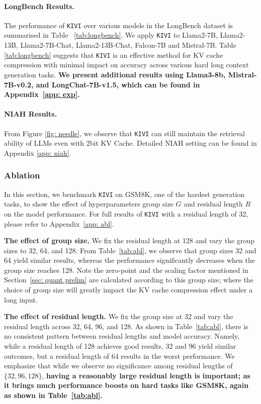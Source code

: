 \paragraph{LongBench Results.} The performance of \texttt{KIVI} over various models in the LongBench dataset is summarised in Table ~\ref{tab:longbench}. We apply \texttt{KIVI} to Llama2-7B, Llama2-13B, Llama2-7B-Chat, Llama2-13B-Chat, Falcon-7B and Mistral-7B. Table \ref{tab:longbench} suggests that \texttt{KIVI} is an effective method for KV cache compression with minimal impact on accuracy across various hard long context generation tasks.
\textbf{We present additional results using Llama3-8b, Mistral-7B-v0.2, and LongChat-7B-v1.5, which can be found in Appendix~\ref{app: exp}.}

\paragraph{NIAH Results.} From Figure \ref{fig: needle}, we observe that \texttt{KIVI} can still maintain the retrieval ability of LLMs even with 2bit KV Cache. Detailed NIAH setting can be found in Appendix \ref{app: niah}.

\subsubsection{Ablation}

In this section, we benchmark \texttt{KIVI} on GSM8K, one of the hardest generation tasks, to show the effect of hyperparameters group size $G$ and residual length $R$ on the model performance. For full results of \texttt{KIVI} with a residual length of 32, please refer to Appendix~\ref{app: abl}.

\textbf{The effect of group size.} We fix the residual length at 128 and vary the group sizes to 32, 64, and 128. From Table~\ref{tab:abl}, we observe that group sizes 32 and 64 yield similar results, whereas the performance significantly decreases when the group size reaches 128. Note the zero-point and the scaling factor mentioned in Section~\ref{sec: quant prelim} are calculated according to this group size; where the choice of group size will greatly impact the KV cache compression effect under a long input.

\textbf{The effect of residual length.} We fix the group size at 32 and vary the residual length across 32, 64, 96, and 128. As shown in Table~\ref{tab:abl}, 
there is no consistent pattern between residual lengths and model accuracy. Namely, while a residual length of 128 achieves good results, 32 and 96 yield similar outcomes, but a residual length of 64 results in the worst performance. We emphasize that while we observe no significance among residual lengths of $\{32, 96, 128\}$, \textbf{having a reasonably large residual length is important; as it brings much performance boosts on hard tasks like GSM8K, again as shown in Table~\ref{tab:abl}.}

